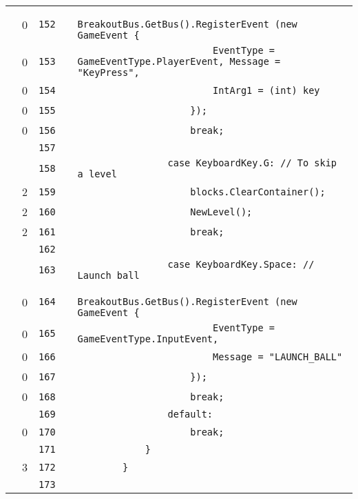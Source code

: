 \documentclass[a4paper,landscape,10pt]{article}
\begin{document}
\begin{longtable}[l]{lrrll}
\cellcolor{red} & 0 & \verb~152~ & & \verb~                    BreakoutBus.GetBus().RegisterEvent (new GameEvent {~\\
\cellcolor{red} & 0 & \verb~153~ & & \verb~                        EventType = GameEventType.PlayerEvent, Message = "KeyPress",~\\
\cellcolor{red} & 0 & \verb~154~ & & \verb~                        IntArg1 = (int) key~\\
\cellcolor{red} & 0 & \verb~155~ & & \verb~                    });~\\
\cellcolor{red} & 0 & \verb~156~ & & \verb~                    break;~\\
\cellcolor{gray} &  & \verb~157~ & & \verb~~\\
\cellcolor{gray} &  & \verb~158~ & & \verb~                case KeyboardKey.G: // To skip a level~\\
\cellcolor{green} & 2 & \verb~159~ & & \verb~                    blocks.ClearContainer();~\\
\cellcolor{green} & 2 & \verb~160~ & & \verb~                    NewLevel();~\\
\cellcolor{green} & 2 & \verb~161~ & & \verb~                    break;~\\
\cellcolor{gray} &  & \verb~162~ & & \verb~~\\
\cellcolor{gray} &  & \verb~163~ & & \verb~                case KeyboardKey.Space: // Launch ball~\\
\cellcolor{red} & 0 & \verb~164~ & & \verb~                    BreakoutBus.GetBus().RegisterEvent (new GameEvent {~\\
\cellcolor{red} & 0 & \verb~165~ & & \verb~                        EventType = GameEventType.InputEvent,~\\
\cellcolor{red} & 0 & \verb~166~ & & \verb~                        Message = "LAUNCH_BALL"~\\
\cellcolor{red} & 0 & \verb~167~ & & \verb~                    });~\\
\cellcolor{red} & 0 & \verb~168~ & & \verb~                    break;~\\
\cellcolor{gray} &  & \verb~169~ & & \verb~                default:~\\
\cellcolor{red} & 0 & \verb~170~ & & \verb~                    break;~\\
\cellcolor{gray} &  & \verb~171~ & & \verb~            }~\\
\cellcolor{green} & 3 & \verb~172~ & & \verb~        }~\\
\cellcolor{gray} &  & \verb~173~ & & \verb~~\\

\end{longtable}
\end{document}
